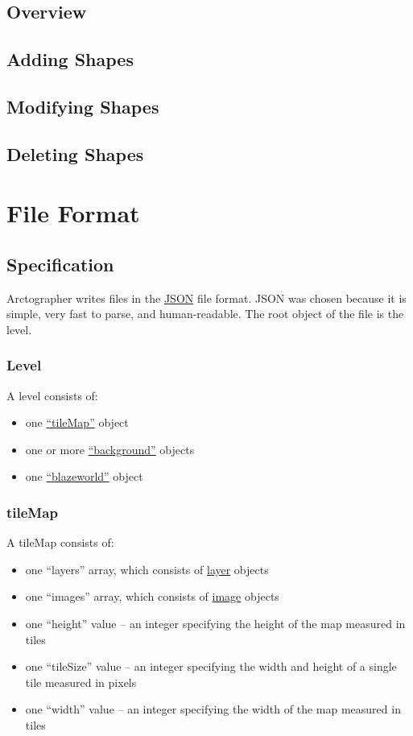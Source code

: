 \documentclass[12pt,letterpaper]{article}
\begin{document}
\subsection{Overview}
\subsection{Adding Shapes}
\subsection{Modifying Shapes}
\subsection{Deleting Shapes}

\section{File Format}
\label{sec:fileformat}
\subsection{Specification}

Arctographer writes files in the \href{http://json.org/}{JSON} file format. JSON
was chosen because it is simple, very fast to parse, and human-readable. The
root object of the file is the level.
\subsubsection*{Level}
A level consists of:
\begin{itemize}
	\item one \hyperref[sec:tilemap]{``tileMap''} object
	\item one or more \hyperref[sec:background]{``background''} objects
	\item one \hyperref[sec:blazeworld]{``blazeworld''} object
\end{itemize}
\subsubsection*{tileMap}
\label{sec:tilemap}
A tileMap consists of:
\begin{itemize}
	\item one ``layers'' array, which consists of \hyperref[sec:layer]{layer} objects
	\item one ``images'' array, which consists of \hyperref[sec:image]{image} objects
	\item one ``height'' value -- an integer specifying the height of the
		map measured in tiles
	\item one ``tileSize'' value -- an integer specifying the width and
		height of a single tile measured in pixels
	\item one ``width'' value -- an integer specifying the width of the
		map measured in tiles
\end{itemize}
\end{document}
